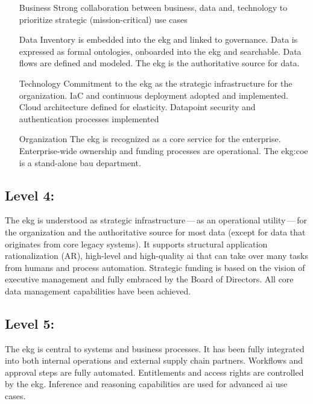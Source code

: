 \begin{itemize}[leftmargin=1in,font=\bfseries]

    \item[Business]     Strong collaboration between business, data and, technology to prioritize strategic
                        (mission-critical) use cases
    \item[Data]         Inventory is embedded into the \gls{ekg} and linked to governance.
                        Data is expressed as formal ontologies, onboarded into the \gls{ekg} and searchable.
                        Data flows are defined and modeled.
                        The \gls{ekg} is the authoritative source for data.
    \item[Technology]   Commitment to the \gls{ekg} as the strategic infrastructure for the organization.
                        IaC and continuous deployment adopted and implemented.
                        Cloud architecture defined for elasticity.
                        Datapoint security and authentication processes implemented
    \item[Organization] The \gls{ekg} is recognized as a core service for the enterprise.
                        Enterprise-wide ownership and funding processes are operational.
                        The \gls{ekg:coe} is a stand-alone \gls{bau} department.
\end{itemize}

\subsection{Level 4: \ekgmmLevelFourLabel}

The \gls{ekg} is understood as strategic infrastructure\,---\,as an operational utility\,---\,for the organization
and the authoritative source for most data (except for data that originates from core legacy systems).
It supports structural application rationalization (AR), high-level and high-quality \gls{ai} that can take over
many tasks from humans and process automation.
Strategic funding is based on the vision of executive management and fully embraced by the Board of Directors.
All core data management capabilities have been achieved.

\subsection{Level 5: \ekgmmLevelFiveLabel}

The \gls{ekg} is central to systems and business processes.
It has been fully integrated into both internal operations and external supply chain partners.
Workflows and approval steps are fully automated.
Entitlements and access rights are controlled by the \gls{ekg}.
Inference and reasoning capabilities are used for advanced \gls{ai} use cases.

